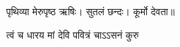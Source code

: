 \centerline{पृथिव्या  मेरुपृष्ठ  ऋषिः।  सुतलं  छन्दः।  कूर्मो  देवता॥}
{त्वं  च  धारय  मां  देवि  पवित्रं  चाऽऽसनं  कुरु}
